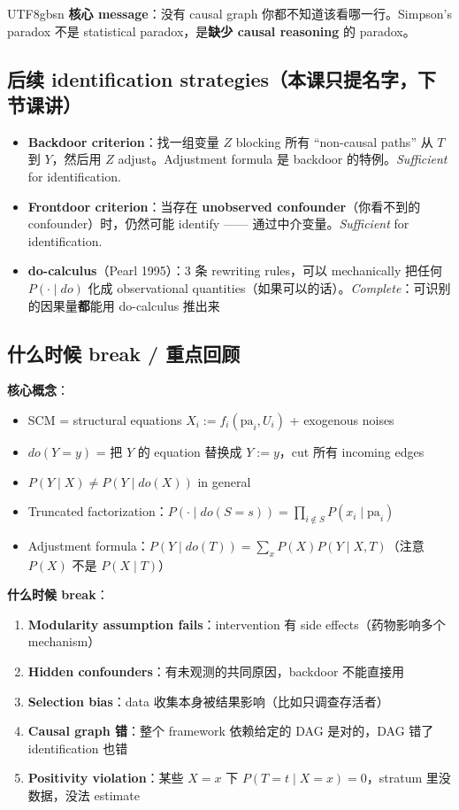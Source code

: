 \documentclass[11pt]{article}
\begin{document}
\begin{CJK}{UTF8}{gbsn}
\textbf{核心 message}：没有 causal graph 你都不知道该看哪一行。Simpson's paradox 不是 statistical paradox，是\textbf{缺少 causal reasoning} 的 paradox。

\subsection{后续 identification strategies（本课只提名字，下节课讲）}

\begin{itemize}[nosep]
  \item \textbf{Backdoor criterion}：找一组变量 $Z$ blocking 所有 ``non-causal paths'' 从 $T$ 到 $Y$，然后用 $Z$ adjust。Adjustment formula 是 backdoor 的特例。\emph{Sufficient} for identification.
  \item \textbf{Frontdoor criterion}：当存在 \textbf{unobserved confounder}（你看不到的 confounder）时，仍然可能 identify —— 通过中介变量。\emph{Sufficient} for identification.
  \item \textbf{do-calculus}（Pearl 1995）：3 条 rewriting rules，可以 mechanically 把任何 $P(\cdot \mid do)$ 化成 observational quantities（如果可以的话）。\emph{Complete}：可识别的因果量\textbf{都}能用 do-calculus 推出来
\end{itemize}

\subsection{什么时候 break / 重点回顾}

\textbf{核心概念}：
\begin{itemize}[nosep]
  \item SCM = structural equations $X_i := f_i(\text{pa}_i, U_i)$ + exogenous noises
  \item $do(Y = y)$ = 把 $Y$ 的 equation 替换成 $Y := y$，cut 所有 incoming edges
  \item $P(Y \mid X) \neq P(Y \mid do(X))$ in general
  \item Truncated factorization：$P(\cdot \mid do(S=s)) = \prod_{i \notin S} P(x_i \mid \text{pa}_i)$
  \item Adjustment formula：$P(Y \mid do(T)) = \sum_x P(X) P(Y \mid X, T)$（注意 $P(X)$ 不是 $P(X \mid T)$）
\end{itemize}

\textbf{什么时候 break}：
\begin{enumerate}[nosep]
  \item \textbf{Modularity assumption fails}：intervention 有 side effects（药物影响多个 mechanism）
  \item \textbf{Hidden confounders}：有未观测的共同原因，backdoor 不能直接用
  \item \textbf{Selection bias}：data 收集本身被结果影响（比如只调查存活者）
  \item \textbf{Causal graph 错}：整个 framework 依赖给定的 DAG 是对的，DAG 错了 identification 也错
  \item \textbf{Positivity violation}：某些 $X = x$ 下 $P(T = t \mid X = x) = 0$，stratum 里没数据，没法 estimate
\end{enumerate}


\end{CJK}
\end{document}
